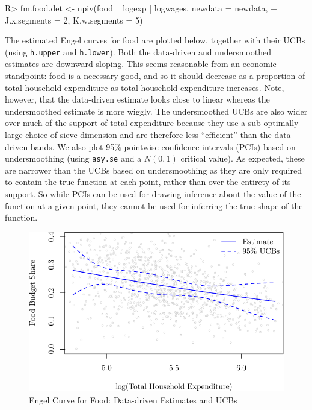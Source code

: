 \documentclass[
]{jss}
\begin{document}
\begin{CodeChunk}
\begin{CodeInput}
R> fm.food.det <- npiv(food ~ logexp | logwages, newdata = newdata, 
+                     J.x.segments = 2, K.w.segments = 5)
\end{CodeInput}
\end{CodeChunk}

The estimated Engel curves for food are plotted below, together with
their UCBs (using \texttt{h.upper} and \texttt{h.lower}). Both the
data-driven and undersmoothed estimates are downward-sloping. This seems
reasonable from an economic standpoint: food is a necessary good, and so
it should decrease as a proportion of total household expenditure as
total household expenditure increases. Note, however, that the
data-driven estimate looks close to linear whereas the undersmoothed
estimate is more wiggly. The undersmoothed UCBs are also wider over much
of the support of total expenditure because they use a sub-optimally
large choice of sieve dimension and are therefore less ``efficient''
than the data-driven bands. We also plot 95\% pointwise confidence
intervals (PCIs) based on undersmoothing (using \texttt{asy.se} and a
\(N(0,1)\) critical value). As expected, these are narrower than the
UCBs based on undersmoothing as they are only required to contain the
true function at each point, rather than over the entirety of its
support. So while PCIs can be used for drawing inference about the value
of the function at a given point, they cannot be used for inferring the
true shape of the function.

\begin{figure}
\centering
\includegraphics{npiv_files/figure-latex/food-dd-1.pdf}
\caption{Engel Curve for Food: Data-driven Estimates and UCBs}
\end{figure}
\end{document}
